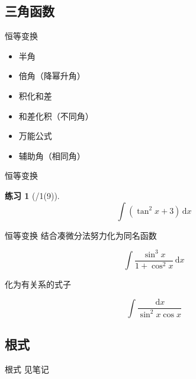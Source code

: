 \documentclass[UTF8]{ctexbeamer}
\def\diff{\,\mathrm{d}}
\newtheorem{exercise}[theorem]{练习} %
\begin{document}
\subsection{三角函数}
\begin{frame}
\subsectionpage
\end{frame}

\begin{frame}{恒等变换}
\begin{itemize}
	\item 半角
	\item 倍角（降幂升角）
	\item 积化和差
	\item 和差化积（不同角）
	\item 万能公式
	\item 辅助角（相同角）
\end{itemize}
\end{frame}

\begin{frame}{恒等变换}
\begin{exercise}[/1(9)]
\[\int(\tan^2 x+3)\diff x\]
\end{exercise}
\end{frame}

\begin{frame}{恒等变换}
结合凑微分法努力化为同名函数
\begin{example}
\[\int\frac{\sin^3x}{1+\cos^2 x}\diff x\]
\end{example}
化为有关系的式子
\begin{example}
\[\int\frac{\diff x}{\sin^2 x\cos x}\]
\end{example}
\end{frame}

\subsection{根式}
\begin{frame}
\subsectionpage
\end{frame}

\begin{frame}{根式}
见笔记
\end{frame}
\end{document}
